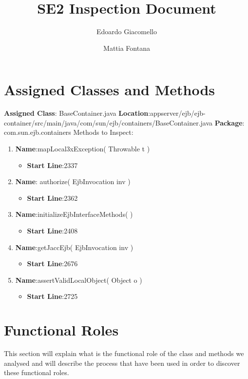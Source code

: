 \documentclass[11pt, a4paper,titlepage]{article}
\author{Edoardo Giacomello \and Mattia Fontana}
\title{SE2 Inspection Document}
\begin{document}
\maketitle
\tableofcontents
\newpage
\section{Assigned Classes and Methods}
\textbf{Assigned Class}: BaseContainer.java
\textbf{Location}:\newline appserver/ejb/ejb-container/src/main/java/com/sun/ejb/containers/BaseContainer.java
\textbf{Package}: com.sun.ejb.containers
Methods to Inspect:
	\begin{enumerate}
		\item	\textbf{Name}:mapLocal3xException( Throwable t )
		\begin{itemize}
		\item		\textbf{Start Line}:2337
		\end{itemize}
		\item	\textbf{Name}: authorize( EjbInvocation inv )
		\begin{itemize}
		\item		\textbf{Start Line}:2362
		\end{itemize}
		\item	\textbf{Name}:initializeEjbInterfaceMethods( )
		\begin{itemize}
		\item		\textbf{Start Line}:2408
		\end{itemize}
		\item	\textbf{Name}:getJaccEjb( EjbInvocation inv )
		\begin{itemize}
		\item		\textbf{Start Line}:2676
		\end{itemize}
		\item	\textbf{Name}:assertValidLocalObject( Object o )
		\begin{itemize}
		\item		\textbf{Start Line}:2725
		\end{itemize}
		\end{enumerate}

\section{Functional Roles}
	This section will explain what is the functional role of the class and methods we analysed and will describe the process that have been used in order to discover these functional roles.
	\newline
	\newline
\end{document}
